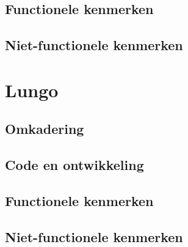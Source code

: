 \subsection{Functionele kenmerken}
\subsection{Niet-functionele kenmerken}

\section{Lungo}

\subsection{Omkadering}
\subsection{Code en ontwikkeling}
\subsection{Functionele kenmerken}
\subsection{Niet-functionele kenmerken}
